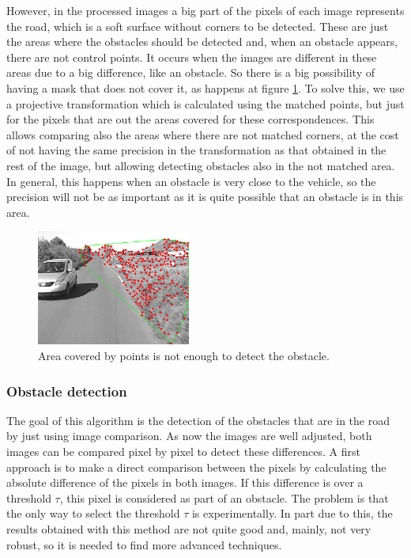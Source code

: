However, in the processed images a big part of the pixels of each image represents the road, which is a soft surface without corners to be detected. These are just the areas where the obstacles should be detected and, when an obstacle appears, there are not control points. It occurs when the images are different in these areas due to a big difference, like an obstacle. So there is a big possibility of having a mask that does not cover it, as happens at figure \ref{fig:cp01_mask_not_covers}. To solve this, we use a projective transformation which is calculated using the matched points, but just for the pixels that are out the areas covered for these correspondences. This allows comparing also the areas where there are not matched corners, at the cost of not having the same precision in the transformation as that obtained in the rest of the image, but allowing detecting obstacles also in the not matched area. In general, this happens when an obstacle is very close to the vehicle, so the precision will not be as important as it is quite possible that an obstacle is in this area.

\begin{figure}[h!]
\centering
\includegraphics[width=0.45\textwidth]{maskNotCovers}
\caption{Area covered by points is not enough to detect the obstacle.}\label{fig:cp01_mask_not_covers}
\end{figure}

\subsubsection{Obstacle detection}\label{ch:chapter01_01_03_02}

The goal of this algorithm is the detection of the obstacles that are in the road by just using image comparison. As now the images are well adjusted, both images can be compared pixel by pixel to detect these differences. A first approach is to make a direct comparison between the pixels by calculating the absolute difference of the pixels in both images. If this difference is over a threshold $\tau$, this pixel is considered as part of an obstacle. The problem is that the only way to select the threshold $\tau$ is experimentally. In part due to this, the results obtained with this method are not quite good and, mainly, not very robust, so it is needed to find more advanced techniques.

